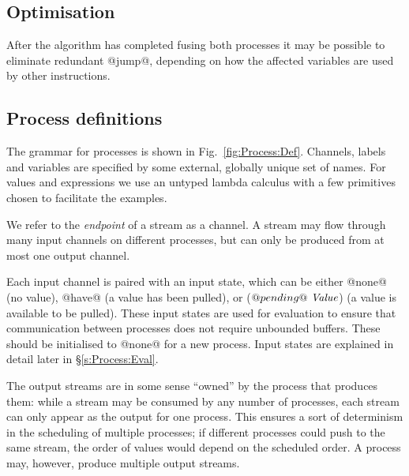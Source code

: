 \subsection{Optimisation}
After the algorithm has completed fusing both processes it may be possible to eliminate redundant @jump@, depending on how the affected variables are used by other instructions.




\clearpage{}
\subsection{Process definitions}



The grammar for processes is shown in Fig.~\ref{fig:Process:Def}.
Channels, labels and variables are specified by some external, globally unique set of names.
For values and expressions we use an untyped lambda calculus with a few primitives chosen to facilitate the examples.

We refer to the \emph{endpoint} of a stream as a channel.
A stream may flow through many input channels on different processes, but can only be produced from at most one output channel.

Each input channel is paired with an input state, which can be either @none@ (no value), @have@ (a value has been pulled), or ($@pending@~\textit{Value}$) (a value is available to be pulled).
These input states are used for evaluation to ensure that communication between processes does not require unbounded buffers.
These should be initialised to @none@ for a new process.
Input states are explained in detail later in \S\ref{s:Process:Eval}.

The output streams are in some sense ``owned'' by the process that produces them: while a stream may be consumed by any number of processes, each stream can only appear as the output for one process.
This ensures a sort of determinism in the scheduling of multiple processes; if different processes could push to the same stream, the order of values would depend on the scheduled order.
A process may, however, produce multiple output streams.

